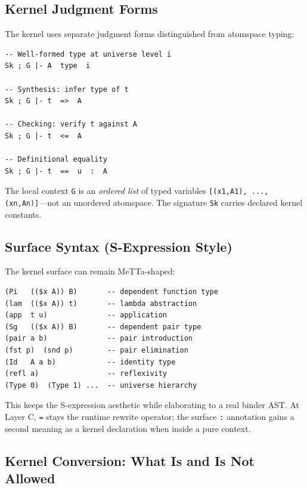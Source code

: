 \documentclass[11pt]{article}
\newcommand{\code}[1]{\texttt{#1}}
\begin{document}
\subsection{Kernel Judgment Forms}

The kernel uses separate judgment forms distinguished from atomspace typing:

\begin{lstlisting}[language={},caption={Proposed MeTTa-Pure judgment forms}]
-- Well-formed type at universe level i
Sk ; G |- A  type  i

-- Synthesis: infer type of t
Sk ; G |- t  =>  A

-- Checking: verify t against A
Sk ; G |- t  <=  A

-- Definitional equality
Sk ; G |- t  ==  u  :  A
\end{lstlisting}

The local context \code{G} is an \emph{ordered list} of typed variables
\code{[(x1,A1), ..., (xn,An)]}---not an unordered atomspace.
The signature \code{Sk} carries declared kernel constants.

\subsection{Surface Syntax (S-Expression Style)}

The kernel surface can remain MeTTa-shaped:

\begin{lstlisting}[language={},caption={Proposed MeTTa-Pure surface forms}]
(Pi   (($x A)) B)       -- dependent function type
(lam  (($x A)) t)       -- lambda abstraction
(app  t u)              -- application
(Sg   (($x A)) B)       -- dependent pair type
(pair a b)              -- pair introduction
(fst p)  (snd p)        -- pair elimination
(Id   A a b)            -- identity type
(refl a)                -- reflexivity
(Type 0)  (Type 1) ...  -- universe hierarchy
\end{lstlisting}

This keeps the S-expression aesthetic while elaborating to a real binder AST.
At Layer C, \code{=} stays the runtime rewrite operator; the surface \code{:}
annotation gains a second meaning as a kernel declaration when inside a
pure context.

\subsection{Kernel Conversion: What Is and Is Not Allowed}
\end{document}
